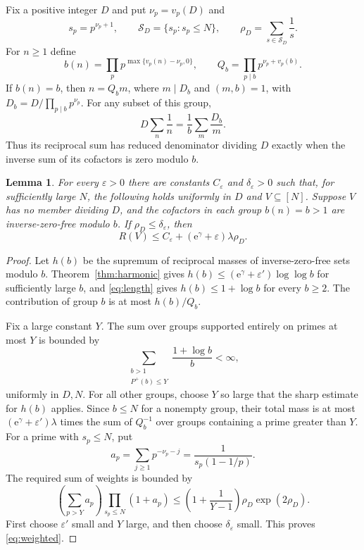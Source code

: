 \documentclass[11pt,leqno]{amsart}
\numberwithin{equation}{section}
\newtheorem{lemma}[theorem]{Lemma}
\theoremstyle{definition}
\theoremstyle{remark}
\newcommand{\e}{\mathrm e}
\newcommand{\eps}{\varepsilon}
\newcommand{\Ph}{P^{+}}
\begin{document}
Fix a positive integer $D$ and put $\nu_p=v_p(D)$ and
\begin{equation}\label{eq:missingpowers}
 s_p=p^{\nu_p+1},\qquad
 \mathcal S_D=\{s_p:s_p\le N\},\qquad
 \rho_D=\sum_{s\in\mathcal S_D}\frac1s.
\end{equation}
For $n\ge1$ define
\begin{equation}\label{eq:excess}
 b(n)=\prod_p p^{\max\{v_p(n)-\nu_p,0\}},\qquad
 Q_b=\prod_{p\mid b}p^{\nu_p+v_p(b)}.
\end{equation}
If $b(n)=b$, then $n=Q_bm$, where $m\mid D_b$ and $(m,b)=1$, with
$D_b=D/\prod_{p\mid b}p^{\nu_p}$.
For any subset of this group,
\begin{equation}\label{eq:compatibility}
 D\sum_n\frac1n=\frac1b\sum_m\frac{D_b}{m}.
\end{equation}
Thus its reciprocal sum has reduced denominator dividing $D$ exactly
when the inverse sum of its cofactors is zero modulo $b$.

\begin{lemma}\label{lem:weighted}
For every $\eps>0$ there are constants $C_\eps$ and $\delta_\eps>0$
such that, for sufficiently large $N$, the following holds uniformly in
$D$ and $V\subseteq[N]$. Suppose $V$ has no member dividing $D$, and
the cofactors in each group $b(n)=b>1$ are inverse-zero-free modulo $b$.
If $\rho_D\le\delta_\eps$, then
\begin{equation}\label{eq:weighted}
 R(V)\le C_\eps+(\e^\gamma+\eps)\lambda\rho_D.
\end{equation}
\end{lemma}

\begin{proof}
Let $h(b)$ be the supremum of reciprocal masses of inverse-zero-free
sets modulo $b$. Theorem~\ref{thm:harmonic} gives
$h(b)\le(\e^\gamma+\eps')\log\log b$ for sufficiently large $b$,
and \eqref{eq:length} gives $h(b)\le1+\log b$ for every $b\ge2$.
The contribution of group $b$ is at most $h(b)/Q_b$.

Fix a large constant $Y$. The sum over groups supported entirely on
primes at most $Y$ is bounded by
\[
 \sum_{\substack{b>1\\\Ph(b)\le Y}}\frac{1+\log b}{b}<\infty,
\]
uniformly in $D,N$. For all other groups, choose $Y$ so large that the
sharp estimate for $h(b)$ applies. Since $b\le N$ for a nonempty group,
their total mass is at most $(\e^\gamma+\eps')\lambda$ times the sum of
$Q_b^{-1}$ over groups containing a prime greater than $Y$.
For a prime with $s_p\le N$, put
\[
 a_p=\sum_{j\ge1}p^{-\nu_p-j}
 =\frac1{s_p(1-1/p)}.
\]
The required sum of weights is bounded by
\[
 \left(\sum_{p>Y}a_p\right)\prod_{s_p\le N}(1+a_p)
 \le\left(1+\frac1{Y-1}\right)\rho_D\exp(2\rho_D).
\]
First choose $\eps'$ small and $Y$ large, and then choose
$\delta_\eps$ small. This proves \eqref{eq:weighted}.
\end{proof}
\end{document}
